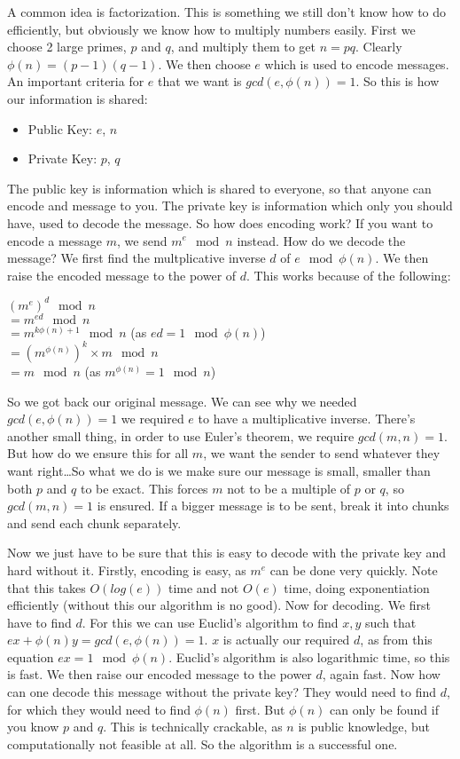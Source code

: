 \documentclass[a4paper,10pt]{article}
\theoremstyle{definition} %
\begin{document}
    A common idea is factorization. This is something we still don't know how to do efficiently,
    but obviously we know how to multiply numbers easily. First we choose 2 large primes, $p$ and 
    $q$, and multiply them to get $n = pq$. Clearly $\phi(n) = (p-1)(q-1)$. We then choose $e$
    which is used to encode messages. An important criteria for $e$ that we want is $gcd(e, \phi(n)) 
    = 1$. So this is how our information is shared:
    \begin{itemize}
        \item Public Key: $e$, $n$
        \item Private Key: $p$, $q$
    \end{itemize}
    The public key is information which is shared to everyone, so that anyone can encode and message
    to you. The private key is information which only you should have, used to decode the message.
    So how does encoding work? If you want to encode a message $m$, we send $m^e \mod n$ instead.
    How do we decode the message? We first find the multplicative inverse $d$ of $e \mod \phi(n)$.
    We then raise the encoded message to the power of $d$. This works because of the following:

    $(m^e)^d \mod n$ \\
    $= m^{ed} \mod n$ \\
    $= m^{k\phi(n)+1} \mod n$ (as $ed = 1 \mod \phi(n)$) \\
    $= (m^{\phi(n)})^k \times m \mod n$ \\
    $= m \mod n$ (as $m^{\phi(n)} = 1 \mod n$)

    So we got back our original message. We can see why we needed $gcd(e, \phi(n)) = 1$ we required
    $e$ to have a multiplicative inverse. There's another small thing, in order to use Euler's 
    theorem, we require $gcd(m,n)=1$. But how do we ensure this for all $m$, we want the sender to
    send whatever they want right\dots So what we do is we make sure our message is small, smaller
    than both $p$ and $q$ to be exact. This forces $m$ not to be a multiple of $p$ or $q$, so 
    $gcd(m,n) = 1$ is ensured. If a bigger message is to be sent, break it into chunks and send 
    each chunk separately.

    Now we just have to be sure that this is easy to decode with the private key and hard without it.
    Firstly, encoding is easy, as $m^e$ can be done very quickly. Note that this takes $O(log(e))$ time
    and not $O(e)$ time, doing exponentiation efficiently (without this our algorithm is no good).
    Now for decoding. We first have to find $d$. For this we can use Euclid's algorithm to find
    $x,y$ such that $ex + \phi(n)y = gcd(e, \phi(n)) = 1$. $x$ is actually our required $d$, as 
    from this equation $ex = 1 \mod \phi(n)$. Euclid's algorithm is also logarithmic time, so this is 
    fast. We then raise our encoded message to the power $d$, again fast. Now how can one decode this 
    message without the private key? They would need to find $d$, for which they would need to find 
    $\phi(n)$ first. But $\phi(n)$ can only be found if you know $p$ and $q$. This is technically
    crackable, as $n$ is public knowledge, but computationally not feasible at all. So the algorithm
    is a successful one.
\end{document}

